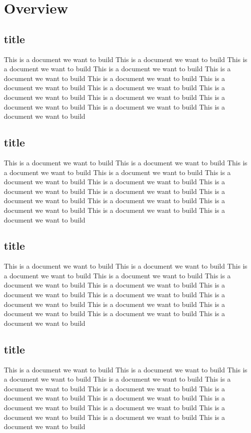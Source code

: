\documentclass{book}
\begin{document}
	
	\tableofcontents
	
	\chapter{Overview}
	\setcounter{page}{1}
	\section{title}
	This is a document we want to build	This is a document we want to build	This is a document we want to build	
	This is a document we want to build	
	This is a document we want to build	This is a document we want to build	This is a document we want to build	This is a document we want to build	
	This is a document we want to build	
	This is a document we want to build	
	This is a document we want to build	
	This is a document we want to build	
	This is a document we want to build	
	\section{title}
	This is a document we want to build	This is a document we want to build	This is a document we want to build	
	This is a document we want to build	
	This is a document we want to build	This is a document we want to build	This is a document we want to build	This is a document we want to build	
	This is a document we want to build	
	This is a document we want to build	
	This is a document we want to build	
	This is a document we want to build	
	This is a document we want to build
	\section{title}
	This is a document we want to build	This is a document we want to build	This is a document we want to build	
	This is a document we want to build	
	This is a document we want to build	This is a document we want to build	This is a document we want to build	This is a document we want to build	
	This is a document we want to build	
	This is a document we want to build	
	This is a document we want to build	
	This is a document we want to build	
	This is a document we want to build
	\section{title}
	This is a document we want to build	This is a document we want to build	This is a document we want to build	
	This is a document we want to build	
	This is a document we want to build	This is a document we want to build	This is a document we want to build	This is a document we want to build	
	This is a document we want to build	
	This is a document we want to build	
	This is a document we want to build	
	This is a document we want to build	
	This is a document we want to build
\end{document}
